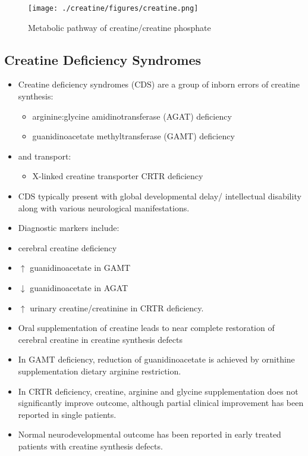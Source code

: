 \documentclass{scrartcl}
\begin{document}
\begin{figure}[htbp]
\centering
\texttt{[image: ./creatine/figures/creatine.png]}
\caption{\label{fig:orgcaa933c}
Metabolic pathway of creatine/creatine phosphate}
\end{figure}


\subsection{Creatine Deficiency Syndromes}
\label{sec:orgc06b081}
\begin{itemize}
\item Creatine deficiency syndromes (CDS) are a group of inborn errors of
creatine synthesis:
\begin{itemize}
\item arginine:glycine amidinotransferase (AGAT) deficiency
\item guanidinoacetate methyltransferase (GAMT) deficiency
\end{itemize}
\item and transport:
\begin{itemize}
\item X-linked creatine transporter CRTR deficiency
\end{itemize}
\item CDS typically present with global developmental delay/ intellectual
disability along with various neurological
manifestations.
\item Diagnostic markers include:
\item cerebral creatine deficiency
\item \(\uparrow\) guanidinoacetate in GAMT
\item \(\downarrow\) guanidinoacetate in AGAT
\item \(\uparrow\) urinary creatine/creatinine in CRTR deficiency.
\item Oral supplementation of creatine leads to near complete restoration
of cerebral creatine in creatine synthesis defects
\item In GAMT deficiency, reduction of guanidinoacetate is achieved by
ornithine supplementation \textpm{} dietary arginine restriction.
\item In CRTR deficiency, creatine, arginine and glycine supplementation
does not significantly improve outcome, although partial clinical
improvement has been reported in single patients.
\item Normal neurodevelopmental outcome has been reported in early treated
patients with creatine synthesis defects.

\end{itemize}
\end{document}
